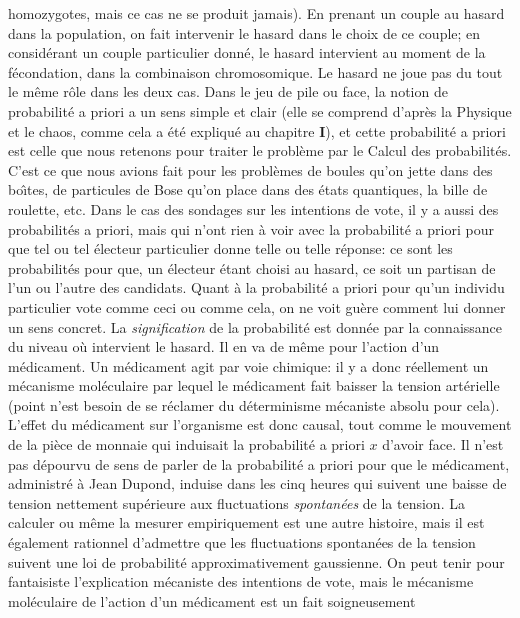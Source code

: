 homozygotes, mais ce cas ne se produit jamais). En prenant un couple
au hasard dans la population, on fait intervenir le hasard dans le choix
de ce couple; en consid\'erant un couple particulier donn\'e, le hasard
intervient au moment de la f\'econdation, dans la combinaison chromosomique. 
Le hasard ne joue pas du tout le m\^eme r\^ole dans les deux cas.
\medskip 
Dans le jeu de pile ou face, la notion de probabilit\'e a priori a un sens 
simple et clair (elle se comprend d'apr\`es la Physique et le chaos, 
comme cela a \'et\'e expliqu\'e au chapitre {\bf I}), et cette 
probabilit\'e a priori est celle que nous retenons pour traiter le
probl\`eme par le Calcul des probabilit\'es. C'est ce que nous avions
fait pour les probl\`emes de boules qu'on jette dans des bo{\^\i}tes, de 
particules de Bose qu'on place dans des \'etats quantiques, la bille de 
roulette, etc. Dans le cas des sondages sur les intentions de vote, 
il y a aussi des probabilit\'es a priori, mais qui n'ont rien 
\`a voir avec la probabilit\'e a priori pour que tel ou tel \'electeur 
particulier donne telle ou telle r\'eponse: ce sont les probabilit\'es pour 
que, un \'electeur \'etant choisi au hasard, ce soit un partisan de l'un ou 
l'autre des candidats.  Quant \`a la probabilit\'e a priori pour qu'un 
individu particulier vote comme ceci ou comme cela, on ne voit gu\`ere 
comment lui donner un sens concret. La {\it signification} de la 
probabilit\'e est donn\'ee par la connaissance du niveau o\`u 
intervient le hasard.
\medskip
Il en va de m\^eme pour l'action d'un m\'edicament.
Un m\'edicament agit par voie chimique: il y a donc 
r\'eellement un m\'ecanisme mol\'eculaire par lequel le m\'edicament 
fait baisser la tension art\'erielle (point n'est besoin de se r\'eclamer 
du d\'eterminisme m\'ecaniste absolu pour cela). L'effet du 
m\'edicament sur l'organisme est donc causal, tout comme le 
mouvement de la pi\`ece de monnaie qui induisait la probabilit\'e a 
priori $x$ d'avoir face. Il n'est pas d\'epourvu de sens de parler de la 
probabilit\'e a priori pour que le m\'edicament, administr\'e \`a Jean 
Dupond, induise dans les cinq heures qui suivent une baisse de tension 
nettement sup\'erieure aux fluctuations {\it spontan\'ees} de la tension. 
La calculer ou m\^eme la mesurer empiriquement est une autre histoire, 
mais il est \'egalement rationnel d'admettre que les fluctuations 
spontan\'ees de la tension \hbox{suivent} une loi de probabilit\'e 
approximativement gaussienne. On peut tenir pour fantaisiste 
l'explication m\'ecaniste des intentions de vote, mais le m\'ecanisme 
mol\'eculaire de l'action d'un m\'edicament est un fait soigneusement 
